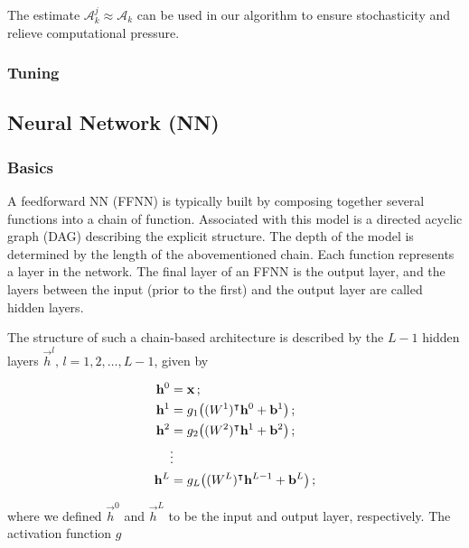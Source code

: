         The estimate $\mathcal{A}_k^j \approx \mathcal{A}_k$ can be used in our algorithm to ensure stochasticity and relieve computational pressure.
    
    \subsubsection{Tuning}\label{sec:tuning}

\subsection{Neural Network (NN)}\label{sec:neural_network}

    \subsubsection{Basics}\label{sec:basics}

    A feedforward NN (FFNN) is typically built by composing together several functions into a chain of function. Associated with this model is a directed acyclic graph (DAG) describing the explicit structure. The depth of the model is determined by the length of the abovementioned chain. Each function represents a layer in the network. The final layer of an FFNN is the output layer, and the layers between the input (prior to the first) and the output layer are called hidden layers. \citep{Goodfellow2016}

    The structure of such a chain-based architecture is described by the $L-1$ hidden layers $\vec{h}^l,\,l=1,2, \dots, L-1$, given by

    \begin{subequations}
        \begin{align} 
            \vec{h}^0 &= \vec{x}\,; \\%
            \vec{h}^1 &= g_1 \big((W^1)\TT \vec{h}^0 + \vec{b}^1\big)\,; \\
            \vec{h}^2 &= g_2 \big( (W^2)\TT \vec{h}^1 + \vec{b}^2\big)\,; \\
            &\vdots \nonumber \\
            \vec{h}^{L} &= g_L \big((W^{L})\TT \vec{h}^{L-1} + \vec{b}^L\big)\,;             
        \end{align}
    \end{subequations}

    where we defined $\vec{h}^0$ and $\vec{h}^L$ to be the input and output layer, respectively. The activation function $g$ \fillertext

